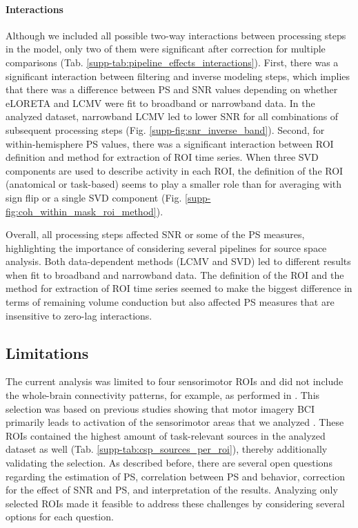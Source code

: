\paragraph{Interactions}

Although we included all possible two-way interactions between processing steps in the model, only two of them were significant after correction for multiple comparisons (Tab. \ref{supp-tab:pipeline_effects_interactions}). First, there was a significant interaction between filtering and inverse modeling steps, which implies that there was a difference between PS and SNR values depending on whether eLORETA and LCMV were fit to broadband or narrowband data. In the analyzed dataset, narrowband LCMV led to lower SNR for all combinations of subsequent processing steps (Fig. \ref{supp-fig:snr_inverse_band}). Second, for within-hemisphere PS values, there was a significant interaction between ROI definition and method for extraction of ROI time series. When three SVD components are used to describe activity in each ROI, the definition of the ROI (anatomical or task-based) seems to play a smaller role than for averaging with sign flip or a single SVD component (Fig. \ref{supp-fig:coh_within_mask_roi_method}).

\medskip

Overall, all processing steps affected SNR or some of the PS measures, highlighting the importance of considering several pipelines for source space analysis. Both data-dependent methods (LCMV and SVD) led to different results when fit to broadband and narrowband data. The definition of the ROI and the method for extraction of ROI time series seemed to make the biggest difference in terms of remaining volume conduction but also affected PS measures that are insensitive to zero-lag interactions.

\subsection{Limitations}
    
The current analysis was limited to four sensorimotor ROIs and did not include the whole-brain connectivity patterns, for example, as performed in \citep{Corsi2020}. This selection was based on previous studies showing that motor imagery BCI primarily leads to activation of the sensorimotor areas that we analyzed \citep{Nierhaus2021}. These ROIs contained the highest amount of task-relevant sources in the analyzed dataset as well (Tab. \ref{supp-tab:csp_sources_per_roi}), thereby additionally validating the selection. As described before, there are several open questions regarding the estimation of PS, correlation between PS and behavior, correction for the effect of SNR and PS, and interpretation of the results. Analyzing only selected ROIs made it feasible to address these challenges by considering several options for each question.

